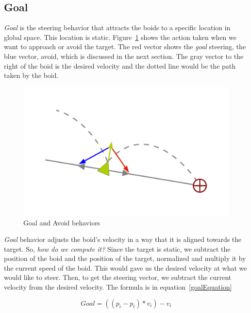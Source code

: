 \subsection{Goal}
\textit{Goal} is the steering behavior that attracts the boids to a specific location in global space. This location is static. Figure~\ref{seekfleePDF} shows the action taken when we want to approach or avoid the target. The red vector shows the \textit{goal} steering, the blue vector, avoid, which is discussed in the next section. The gray vector to the right of the boid is the desired velocity and the dotted line would be the path taken by the boid.

\begin{figure}[htbp]
\begin{center}
\includegraphics[scale=0.5]{figures/seekANDflee.pdf}
\caption{Goal and Avoid behaviors}
\label{seekfleePDF}
\end{center}
\end{figure}

\textit{Goal} behavior adjusts the boid's velocity in a way that it is aligned towards the target. So, \textit{how do we compute it?} Since the target is static, we subtract the position of the boid and the position of the target, normalized and multiply it by the current speed of the boid. This would gave us the desired velocity at what we would like to steer. Then, to get the steering vector, we subtract the current velocity from the desired velocity. The formula is in equation~\ref{goalEquation}

\begin{equation}
\label{goalEquation}
Goal = ((p_i - p_t) * v_i) - v_i
\end{equation}

